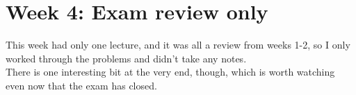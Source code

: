 \documentclass[8.01x]{subfiles}
\begin{document}
\chapter{Week 4: Exam review only}

This week had only one lecture, and it was all a review from weeks 1-2, so I only worked through the problems and didn't take any notes.\\
There is one interesting bit at the very end, though, which is worth watching even now that the exam has closed.
\end{document}
